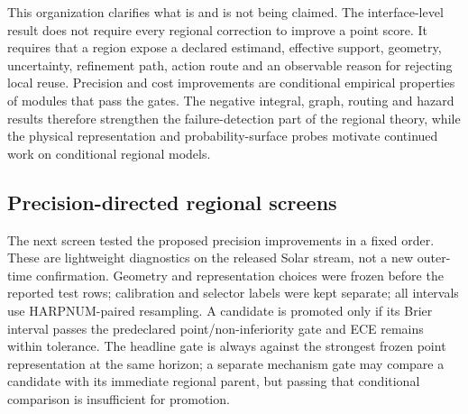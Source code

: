 \documentclass[11pt,a4paper]{article}
\numberwithin{equation}{section}
\theoremstyle{definition}\newtheorem{definition}[theorem]{Definition}
\theoremstyle{remark}\newtheorem{remark}[theorem]{Remark}
\begin{document}
This organization clarifies what is and is not being claimed. The interface-level result does not require every regional correction to improve a point score. It requires that a region expose a declared estimand, effective support, geometry, uncertainty, refinement path, action route and an observable reason for rejecting local reuse. Precision and cost improvements are conditional empirical properties of modules that pass the gates. The negative integral, graph, routing and hazard results therefore strengthen the failure-detection part of the regional theory, while the physical representation and probability-surface probes motivate continued work on conditional regional models.

\subsection{Precision-directed regional screens}
\label{sec:precisiondirected}

The next screen tested the proposed precision improvements in a fixed order. These are lightweight diagnostics on the released Solar stream, not a new outer-time confirmation. Geometry and representation choices were frozen before the reported test rows; calibration and selector labels were kept separate; all intervals use HARPNUM-paired resampling. A candidate is promoted only if its Brier interval passes the predeclared point/non-inferiority gate and ECE remains within tolerance. The headline gate is always against the strongest frozen point representation at the same horizon; a separate mechanism gate may compare a candidate with its immediate regional parent, but passing that conditional comparison is insufficient for promotion.
\end{document}
